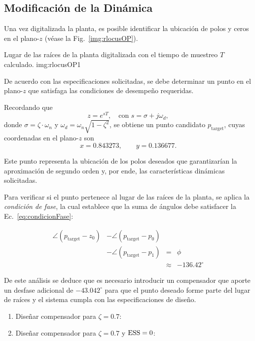 \subsection{Modificaci\'on de la Din\'amica}

Una vez digitalizada la planta, es posible identificar la ubicaci\'on de polos y ceros en el plano-$z$ (v\'ease la Fig.~\ref{img:rlocusOP}).  

{Lugar de las ra\'ices de la planta digitalizada con el tiempo de muestreo $T$ calculado.}
{img:rlocusOP}{1}

De acuerdo con las especificaciones solicitadas, se debe determinar un punto en el plano-$z$ que satisfaga las condiciones de desempe\~no requeridas.  

Recordando que 
\[
z = e^{sT}, \quad \text{con } s = \sigma + j\omega_d,
\]
donde $\sigma = \zeta \cdot \omega_n$ y $\omega_d = \omega_n \sqrt{1-\zeta^2}$,
se obtiene un punto candidato $p_{\text{target}}$, cuyas coordenadas en el plano-$z$ son
\[
x = 0.843273, \qquad y = 0.136677.
\]

Este punto representa la ubicaci\'on de los polos deseados que garantizar\'ian la aproximaci\'on de segundo orden y, por ende, las caracter\'isticas din\'amicas solicitadas.  

Para verificar si el punto pertenece al lugar de las ra\'ices de la planta, se aplica la \emph{condici\'on de fase}, la cual establece que la suma de \'angulos debe satisfacer la Ec.~\eqref{eq:condicionFase}:

\begin{equation}
	\begin{aligned}
		\angle (p_{\text{target}}-z_0) 
		&- \angle (p_{\text{target}}-p_0) \\
		&- \angle (p_{\text{target}}-p_1) 
		&=& \phi \\&&\approx& -136.42^\circ
	\end{aligned}
	\label{eq:condicionFase}
\end{equation}

De este an\'alisis se deduce que es necesario introducir un compensador que aporte un desfase adicional de $-43.042^\circ$ para que el punto deseado forme parte del lugar de ra\'ices y el sistema cumpla con las especificaciones de dise\~no.  


\begin{enumerate}[label=3.\arabic*.]
	\item Diseñar compensador para $\zeta = 0.7$: 
	
	\item Diseñar compensador para $\zeta = 0.7$ y $\mathrm{ESS} = 0$: 
	
\end{enumerate}